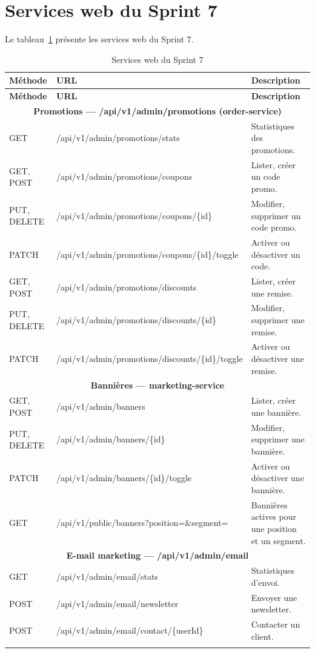 \section{Services web du Sprint 7}
Le tableau~\ref{tab:ws-sprint7} présente les services web du Sprint 7.
\renewcommand{\arraystretch}{1.15}
\setlength{\tabcolsep}{4pt}
\begin{longtable}{|p{1.5cm}|p{6.8cm}|p{6.2cm}|}
\hline
\textbf{Méthode} & \textbf{URL} & \textbf{Description} \\
\hline
\endfirsthead
\hline
\textbf{Méthode} & \textbf{URL} & \textbf{Description} \\
\hline
\endhead
\multicolumn{3}{|c|}{\textbf{Promotions --- /api/v1/admin/promotions (order-service)}} \\
\hline
GET & /api/v1/admin/promotions/stats & Statistiques des promotions. \\
\hline
GET, POST & /api/v1/admin/promotions/coupons & Lister, créer un code promo. \\
\hline
PUT, DELETE & /api/v1/admin/promotions/coupons/\{id\} & Modifier, supprimer un code promo. \\
\hline
PATCH & /api/v1/admin/promotions/coupons/\{id\}/toggle & Activer ou désactiver un code. \\
\hline
GET, POST & /api/v1/admin/promotions/discounts & Lister, créer une remise. \\
\hline
PUT, DELETE & /api/v1/admin/promotions/discounts/\{id\} & Modifier, supprimer une remise. \\
\hline
PATCH & /api/v1/admin/promotions/discounts/\{id\}/toggle & Activer ou désactiver une remise. \\
\hline
\multicolumn{3}{|c|}{\textbf{Bannières --- marketing-service}} \\
\hline
GET, POST & /api/v1/admin/banners & Lister, créer une bannière. \\
\hline
PUT, DELETE & /api/v1/admin/banners/\{id\} & Modifier, supprimer une bannière. \\
\hline
PATCH & /api/v1/admin/banners/\{id\}/toggle & Activer ou désactiver une bannière. \\
\hline
GET & /api/v1/public/banners?position=\&segment= & Bannières actives pour une position et un segment. \\
\hline
\multicolumn{3}{|c|}{\textbf{E-mail marketing --- /api/v1/admin/email}} \\
\hline
GET & /api/v1/admin/email/stats & Statistiques d'envoi. \\
\hline
POST & /api/v1/admin/email/newsletter & Envoyer une newsletter. \\
\hline
POST & /api/v1/admin/email/contact/\{userId\} & Contacter un client. \\
\hline
\caption{Services web du Sprint 7}
\label{tab:ws-sprint7}
\end{longtable}

